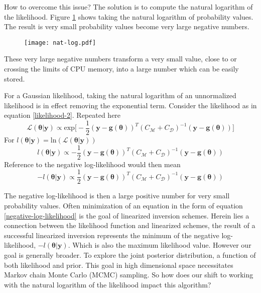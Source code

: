 \begin{tcolorbox}[enhanced jigsaw,breakable,pad at break*=1mm,title=Technical figure 3: Stable computation of likelihood values, title filled,fonttitle=\sffamily\bfseries,fontupper=\sffamily\scriptsize]
\begin{multicols}{2}
\indent How to overcome this issue? The solution is to compute the natural logarithm of the likelihood. Figure \ref{nat-log} shows taking the natural logarithm of probability values. The result is very small probability values become very large negative numbers.

\begin{figure}[H]
	\centering
	\texttt{[image: nat-log.pdf]}
	\label{nat-log}
\end{figure}

These very large negative numbers transform a very small value, close to or crossing the limits of CPU memory, into a large number which can be easily stored. \par

\indent For a Gaussian likelihood, taking the natural logarithm of an unnormalized likelihood is in effect removing the exponential term. Consider the likelihood as in equation \ref{likelihood-2}. Repeated here
\begin{equation}
\mathcal{L}(\bm{\theta}|\bm{y}) \propto \text{exp}\bigg[-\frac{1}{2}(\bm{y}-\bm{g}(\bm{\theta}))^T(C_{\mathcal{M}}+C_{\mathcal{D}})^{-1}(\bm{y}-\bm{g}(\bm{\theta}))\bigg]
\label{repeat-likelihood-2}
\end{equation}
For $l(\bm{\theta}|\bm{y}) = \text{ln}(\mathcal{L}(\bm{\theta}|\bm{y}))$
\begin{equation}
l(\bm{\theta}|\bm{y}) \propto -\frac{1}{2}(\bm{y}-\bm{g}(\bm{\theta}))^T(C_{\mathcal{M}}+C_{\mathcal{D}})^{-1}(\bm{y}-\bm{g}(\bm{\theta}))
\label{log-likelihood}
\end{equation}
Reference to the negative log-likelihood would then mean
\begin{equation}
-l(\bm{\theta}|\bm{y}) \propto \frac{1}{2}(\bm{y}-\bm{g}(\bm{\theta}))^T(C_{\mathcal{M}}+C_{\mathcal{D}})^{-1}(\bm{y}-\bm{g}(\bm{\theta}))
\label{negative-log-likelihood}
\end{equation}

The negative log-likelihood is then a large positive number for very small probability values. Often minimization of an equation in the form of equation \ref{negative-log-likelihood} is the goal of linearized inversion schemes. Herein lies a connection between the likelihood function and linearized schemes, the result of a successful linearized inversion represents the minimum of the negative log-likelihood, $-l(\bm{\theta}|\bm{y})$. Which is also the maximum likelihood value. However our goal is generally broader. To explore the joint posterior distribution, a function of both likelihood and prior. This goal in high dimensional space necessitates Markov chain Monte Carlo (MCMC) sampling. So how does our shift to working with the natural logarithm of the likelihood impact this algorithm? \par


\end{multicols}
\end{tcolorbox}
